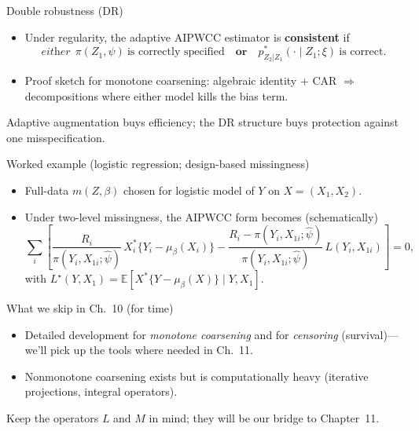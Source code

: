\documentclass[xcolor=dvipsnames,aspectratio=169]{beamer}
\newcommand{\E}{\mathbb{E}}
\newcommand{\1}{\mathbbm{1}}
\begin{document}
\begin{frame}{Double robustness (DR)}
  \begin{itemize}
    \item Under regularity, the adaptive AIPWCC estimator is \textbf{consistent} if
    \[
      \textit{either}\ \ \pi(Z_1,\psi)\ \text{is correctly specified} \quad \textbf{or}\quad p^\ast_{Z_2|Z_1}(\cdot\mid Z_1;\xi)\ \text{is correct}.
    \]
    \item Proof sketch for monotone coarsening: algebraic identity + CAR $\Rightarrow$ decompositions where either model kills the bias term.
  \end{itemize}
  \begin{tcolorbox}[title=Takeaway]
  Adaptive augmentation buys efficiency; the DR structure buys protection against one misspecification.
  \end{tcolorbox}
\end{frame}

\begin{frame}{Worked example (logistic regression; design-based missingness)}
  \begin{itemize}
    \item Full-data $m(Z,\beta)$ chosen for logistic model of $Y$ on $X=(X_1,X_2)$.
    \item Under two-level missingness, the AIPWCC form becomes (schematically)
    \[
      \sum_i\left[\frac{R_i}{\pi(Y_i,X_{1i};\hat\psi)}\,X^\ast_i\{Y_i-\mu_\beta(X_i)\}
      -\frac{R_i-\pi(Y_i,X_{1i};\hat\psi)}{\pi(Y_i,X_{1i};\hat\psi)}\,L(Y_i,X_{1i})\right]=0,
    \]
    with $L^\star(Y,X_1)=\E\!\left[X^\ast\{Y-\mu_\beta(X)\}\mid Y,X_1\right]$.
  \end{itemize}
\end{frame}

\begin{frame}{What we skip in Ch.~10 (for time)}
  \begin{itemize}
    \item Detailed development for \emph{monotone coarsening} and for \emph{censoring} (survival)---we’ll pick up the tools where needed in Ch.~11.
    \item Nonmonotone coarsening exists but is computationally heavy (iterative projections, integral operators).
  \end{itemize}
  \begin{tcolorbox}[title=Pointer]
    Keep the operators $L$ and $M$ in mind; they will be our bridge to Chapter~11.
  \end{tcolorbox}
\end{frame}
\end{document}
